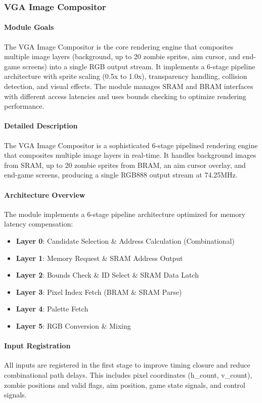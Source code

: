 \documentclass[12pt,a4paper]{article}
\begin{document}
\subsubsection{VGA Image Compositor}
\paragraph{Module Goals}
The VGA Image Compositor is the core rendering engine that composites multiple image layers (background, up to 20 zombie sprites, aim cursor, and end-game screens) into a single RGB output stream. It implements a 6-stage pipeline architecture with sprite scaling (0.5x to 1.0x), transparency handling, collision detection, and visual effects. The module manages SRAM and BRAM interfaces with different access latencies and uses bounds checking to optimize rendering performance.

\paragraph{Detailed Description}
The VGA Image Compositor is a sophisticated 6-stage pipelined rendering engine that composites multiple image layers in real-time. It handles background images from SRAM, up to 20 zombie sprites from BRAM, an aim cursor overlay, and end-game screens, producing a single RGB888 output stream at 74.25MHz.

\paragraph{Architecture Overview}
The module implements a 6-stage pipeline architecture optimized for memory latency compensation:
\begin{itemize}
    \item \textbf{Layer 0}: Candidate Selection \& Address Calculation (Combinational)
    \item \textbf{Layer 1}: Memory Request \& SRAM Address Output
    \item \textbf{Layer 2}: Bounds Check \& ID Select \& SRAM Data Latch
    \item \textbf{Layer 3}: Pixel Index Fetch (BRAM \& SRAM Parse)
    \item \textbf{Layer 4}: Palette Fetch
    \item \textbf{Layer 5}: RGB Conversion \& Mixing
\end{itemize}

\paragraph{Input Registration}
All inputs are registered in the first stage to improve timing closure and reduce combinational path delays. This includes pixel coordinates (h\_count, v\_count), zombie positions and valid flags, aim position, game state signals, and control signals.
\end{document}
